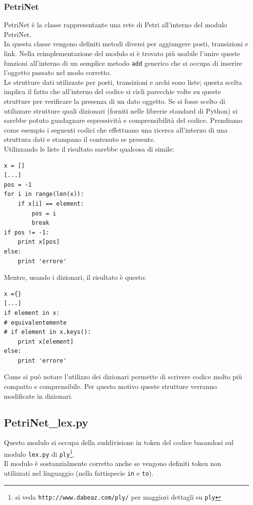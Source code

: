 \documentclass[italian,12pt]{book}
\begin{document}
\subsubsection{PetriNet}
PetriNet è la classe rappresentante una rete di Petri all'interno del modulo PetriNet. \\
In questa classe vengono definiti metodi diversi per aggiungere posti, transizioni e link. Nella 
reimplementazione del modulo si è trovato più usabile l'unire queste funzioni all'interno di un semplice
metodo {\tt add} generico che si occupa di inserire l'oggetto passato nel modo corretto.\\
Le strutture dati utilizzate per posti, transizioni e archi sono liste; questa scelta implica il fatto
che all'interno del codice si cicli parecchie volte su queste strutture per verificare la presenza 
di un dato oggetto. Se si fosse scelto di utilizzare strutture quali dizionari (forniti nelle librerie 
standard di Python) si sarebbe potuto guadagnare espressività e comprensibilità del codice.
Prendiamo come esempio i seguenti codici che effettuano una ricerca all'interno di una struttura 
dati e stampano il contenuto se presente.\\
Utilizzando le liste il risultato sarebbe qualcosa di simile:
\begin{verbatim}x = []
[...]
pos = -1
for i in range(len(x)):
    if x[i] == element:
        pos = i
        break
if pos != -1:
    print x[pos] 
else:
    print 'errore'
\end{verbatim}
Mentre, usando i dizionari, il risultato è questo:
\begin{verbatim}x ={}
[...]
if element in x:
# equivalentemente 
# if element in x.keys():
    print x[element]
else:
    print 'errore'
\end{verbatim}
Come si può notare l'utilizzo dei dizionari permette di scrivere codice molto più compatto e comprensibile.
Per questo motivo queste strutture verranno modificate in dizionari.

\subsection{PetriNet\_lex.py}
Questo modulo si occupa della suddivisione in token del codice basandosi sul modulo {\tt lex.py} di
{\tt ply}\footnote{si veda {\tt http://www.dabeaz.com/ply/} per maggiori dettagli su {\tt ply}}. \\
Il modulo è sostanzialmente corretto anche se vengono definiti token non utilizzati nel linguaggio 
(nella fattispecie {\tt in} e {\tt to}).
\end{document}
